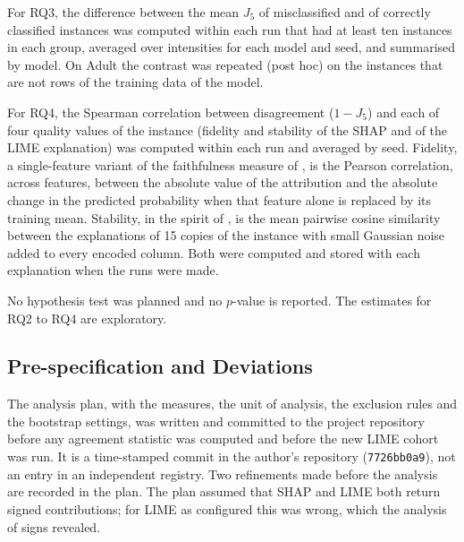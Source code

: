 For RQ3, the difference between the mean $J_5$ of misclassified and of correctly
classified instances was computed within each run that had at least ten instances in
each group, averaged over intensities for each model and seed, and summarised by model.
On Adult the contrast was repeated (post hoc) on the instances that are not rows of the
training data of the model.

For RQ4, the Spearman correlation between disagreement ($1 - J_5$) and each of four
quality values of the instance (fidelity and stability of the SHAP and of the LIME
explanation) was computed within each run and averaged by seed. Fidelity, a single-feature variant of the faithfulness measure of
\cite{bhatt2020evaluating}, is the Pearson correlation, across features, between the
absolute value of the attribution and the absolute change in the predicted probability
when that feature alone is replaced by its training mean. Stability, in the spirit of \cite{alvarezmelis2018robustness}, is the mean pairwise
cosine similarity between the explanations of 15 copies of the instance with small
Gaussian noise added to every encoded column. Both were
computed and stored with each explanation when the runs were made.

No hypothesis test was planned and no $p$-value is reported. The estimates for RQ2 to RQ4
are exploratory.

\subsection{Pre-specification and Deviations}

The analysis plan, with the measures, the unit of analysis, the exclusion rules and the
bootstrap settings, was written and committed to the project repository before any
agreement statistic was computed and before the new LIME cohort was run. It is a
time-stamped commit in the author's repository (\texttt{7726bb0a9}), not an entry in an independent registry.
Two refinements made before the analysis are recorded in the plan. The plan assumed that
SHAP and LIME both return signed contributions; for LIME as configured this was wrong,
which the analysis of signs revealed.

